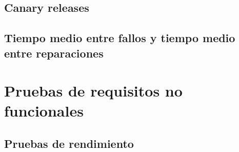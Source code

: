 \documentclass[11pt,a4paper]{article}
\begin{document}
\subsection{Canary releases}

\subsection{Tiempo medio entre fallos y tiempo medio entre reparaciones}

\section{Pruebas de requisitos no funcionales}

\subsection{Pruebas de rendimiento}
\end{document}
